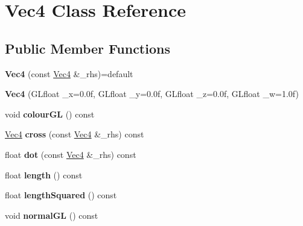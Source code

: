 \hypertarget{classVec4}{}\section{Vec4 Class Reference}
\label{classVec4}
\subsection*{Public Member Functions}
\begin{DoxyCompactItemize}
\item 
{\bfseries Vec4} (const \hyperlink{classVec4}{Vec4} \&\+\_\+rhs)=default\hypertarget{classVec4_a7fd0194b237680588058b50e8d80bee3}{}\label{classVec4_a7fd0194b237680588058b50e8d80bee3}

\item 
{\bfseries Vec4} (G\+Lfloat \+\_\+x=0.\+0f, G\+Lfloat \+\_\+y=0.\+0f, G\+Lfloat \+\_\+z=0.\+0f, G\+Lfloat \+\_\+w=1.\+0f)\hypertarget{classVec4_a88c48fa08f6b300577b374d3078186f8}{}\label{classVec4_a88c48fa08f6b300577b374d3078186f8}

\item 
void {\bfseries colour\+GL} () const \hypertarget{classVec4_ab6408ead37201958bbf4a9680b8d65a9}{}\label{classVec4_ab6408ead37201958bbf4a9680b8d65a9}

\item 
\hyperlink{classVec4}{Vec4} {\bfseries cross} (const \hyperlink{classVec4}{Vec4} \&\+\_\+rhs) const \hypertarget{classVec4_a5a2139b9f193e528e8f9bee0d0a14652}{}\label{classVec4_a5a2139b9f193e528e8f9bee0d0a14652}

\item 
float {\bfseries dot} (const \hyperlink{classVec4}{Vec4} \&\+\_\+rhs) const \hypertarget{classVec4_a91498b8d3af850201aababdeb523c58e}{}\label{classVec4_a91498b8d3af850201aababdeb523c58e}

\item 
float {\bfseries length} () const \hypertarget{classVec4_a08573e03357a6d14294da98c46cbab58}{}\label{classVec4_a08573e03357a6d14294da98c46cbab58}

\item 
float {\bfseries length\+Squared} () const \hypertarget{classVec4_ae2413a4eb232a55f15bafa13e49e75b7}{}\label{classVec4_ae2413a4eb232a55f15bafa13e49e75b7}

\item 
void {\bfseries normal\+GL} () const \hypertarget{classVec4_aefca6527cea99964c2075a02de8b341d}{}\label{classVec4_aefca6527cea99964c2075a02de8b341d}


\end{DoxyCompactItemize}
